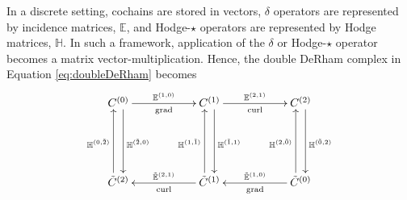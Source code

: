 In a discrete setting, cochains are stored in vectors, $\delta$ operators are represented by incidence matrices, $\mathbb{E}$, and Hodge-$\star$ operators are represented by Hodge matrices, $\mathbb{H}$. In such a framework, application of the $\delta$ or Hodge-$\star$ operator becomes a matrix vector-multiplication. Hence, the double DeRham complex in Equation \eqref{eq:doubleDeRham} becomes
\begin{equation}
    \begin{gathered}
        \xymatrix@=13ex{
            C^{(0)} \ar[r]^{\mathbb{E}^{(1,0)}}_{\text{grad}} \ar@<1ex>[d]^{\mathbb{H}^{(\tilde{2},0)}} & C^{(1)} \ar[r]^{\mathbb{E}^{(2,1)}}_{\text{curl}} \ar@<1ex>[d]^{\mathbb{H}^{(\tilde{1},1)}} & C^{(2)} \ar@<1ex>[d]^{\mathbb{H}^{(\tilde{0},2)}} \\
            \tilde{C}^{(2)} \ar@<1ex>[u]^{\mathbb{H}^{(0,\tilde{2})}} & \tilde{C}^{(1)} \ar[l]_{\tilde{\mathbb{E}}^{(2, 1)}}^{\text{curl}} \ar@<1ex>[u]^{\mathbb{H}^{(1,\tilde{1})}} & \tilde{C}^{(0)} \ar[l]_{\tilde{\mathbb{E}}^{(1,0)}}^{\text{grad}} \ar@<1ex>[u]^{\mathbb{H}^{(2,\tilde{0})}}
        }
    \end{gathered}
\end{equation}
